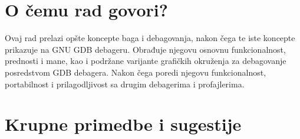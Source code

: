 \documentclass[a4paper]{report}
\begin{document}
\section{O čemu rad govori?}

Ovaj rad prelazi opšte koncepte baga i debagovanja, nakon čega te iste koncepte prikazuje na GNU GDB debageru. Obrađuje njegovu osnovnu funkcionalnost, prednosti i mane, kao i podržane varijante grafičkih okruženja za debagovanje posredstvom GDB debagera. Nakon čega poredi njegovu funkcionalnost, portabilnost i prilagodljivost sa drugim debagerima i profajlerima.
\section{Krupne primedbe i sugestije}
\end{document}
